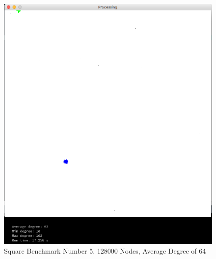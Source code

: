 \documentclass{article}
\begin{document}
\begin{center}
    \begin{figure}
        \includegraphics[scale=0.45]{./images/square_5.png}
        \caption{Square Benchmark Number 5. 128000 Nodes, Average Degree of 64}
        \label{square5}
    \end{figure}
\end{center}
\end{document}
